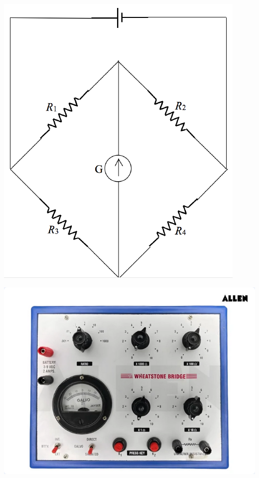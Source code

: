 \documentclass[12pt]{article}
\begin{document}
\vspace{1ex}
\begin{minipage}{.35\textwidth}
    \captionsetup{hypcap=false}
    \centering
    \includegraphics[width=\linewidth]{wheatstone bridge diagram.png}
    \label{fig:diagwheat}
\end{minipage}
\hfill
\begin{minipage}{.55\textwidth}
    \captionsetup{hypcap=false}
    \centering
    \includegraphics[width=\linewidth]{wheatstone bridge instrument.png}
    \label{fig:instruwheat}
\end{minipage}
\end{document}
